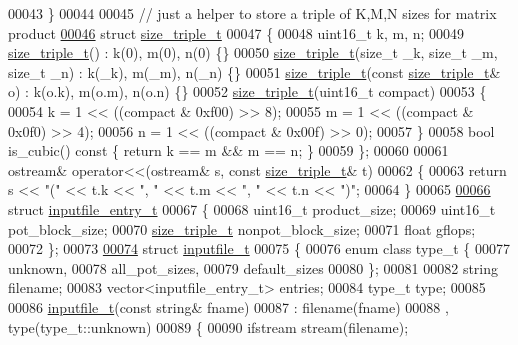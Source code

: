 \begin{DoxyCode}
00043 \}
00044 
00045 \textcolor{comment}{// just a helper to store a triple of K,M,N sizes for matrix product}
\hyperlink{structsize__triple__t}{00046} \textcolor{keyword}{struct }\hyperlink{structsize__triple__t}{size\_triple\_t}
00047 \{
00048   uint16\_t k, m, n;
00049   \hyperlink{structsize__triple__t}{size\_triple\_t}() : k(0), m(0), n(0) \{\}
00050   \hyperlink{structsize__triple__t}{size\_triple\_t}(\textcolor{keywordtype}{size\_t} \_k, \textcolor{keywordtype}{size\_t} \_m, \textcolor{keywordtype}{size\_t} \_n) : k(\_k), m(\_m), n(\_n) \{\}
00051   \hyperlink{structsize__triple__t}{size\_triple\_t}(\textcolor{keyword}{const} \hyperlink{structsize__triple__t}{size\_triple\_t}& o) : k(o.k), m(o.m), n(o.n) \{\}
00052   \hyperlink{structsize__triple__t}{size\_triple\_t}(uint16\_t compact)
00053   \{
00054     k = 1 << ((compact & 0xf00) >> 8);
00055     m = 1 << ((compact & 0x0f0) >> 4);
00056     n = 1 << ((compact & 0x00f) >> 0);
00057   \}
00058   \textcolor{keywordtype}{bool} is\_cubic()\textcolor{keyword}{ const }\{ \textcolor{keywordflow}{return} k == m && m == n; \}
00059 \};
00060 
00061 ostream& operator<<(ostream& s, \textcolor{keyword}{const} \hyperlink{structsize__triple__t}{size\_triple\_t}& t)
00062 \{
00063   \textcolor{keywordflow}{return} s << \textcolor{stringliteral}{"("} << t.k << \textcolor{stringliteral}{", "} << t.m << \textcolor{stringliteral}{", "} << t.n << \textcolor{stringliteral}{")"};
00064 \}
00065 
\hyperlink{structinputfile__entry__t}{00066} \textcolor{keyword}{struct }\hyperlink{structinputfile__entry__t}{inputfile\_entry\_t}
00067 \{
00068   uint16\_t product\_size;
00069   uint16\_t pot\_block\_size;
00070   \hyperlink{structsize__triple__t}{size\_triple\_t} nonpot\_block\_size;
00071   \textcolor{keywordtype}{float} gflops;
00072 \};
00073 
\hyperlink{structinputfile__t}{00074} \textcolor{keyword}{struct }\hyperlink{structinputfile__t}{inputfile\_t}
00075 \{
00076   \textcolor{keyword}{enum class} type\_t \{
00077     unknown,
00078     all\_pot\_sizes,
00079     default\_sizes
00080   \};
00081 
00082   \textcolor{keywordtype}{string} filename;
00083   vector<inputfile\_entry\_t> entries;
00084   type\_t type;
00085 
00086   \hyperlink{structinputfile__t}{inputfile\_t}(\textcolor{keyword}{const} \textcolor{keywordtype}{string}& fname)
00087     : filename(fname)
00088     , type(type\_t::unknown)
00089   \{
00090     ifstream stream(filename);

\end{DoxyCode}
